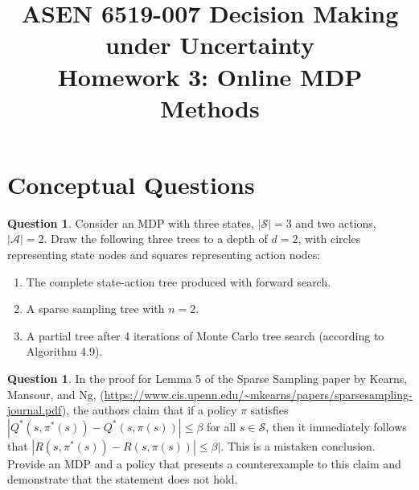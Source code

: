 \documentclass{article}
\title{ASEN 6519-007 Decision Making under Uncertainty\\
       Homework 3: Online MDP Methods}
\theoremstyle{definition}
\newtheorem{question}[thm]{Question}
\begin{document}
\maketitle

\section{Conceptual Questions}


\begin{question}
    Consider an MDP with three states, $|\mathcal{S}| = 3$ and two actions, $|\mathcal{A}| = 2$. Draw the following three trees to a depth of $d=2$, with circles representing state nodes and squares representing action nodes:
    \begin{enumerate}[label=(\alph*)]
        \item The complete state-action tree produced with forward search.
        \item A sparse sampling tree with $n=2$.
        \item A partial tree after 4 iterations of Monte Carlo tree search (according to Algorithm 4.9).
    \end{enumerate}

\end{question}

\begin{question}
    In the proof for Lemma 5 of the Sparse Sampling paper by Kearns, Mansour, and Ng, (\url{https://www.cis.upenn.edu/~mkearns/papers/sparsesampling-journal.pdf}), the authors claim that if a policy $\pi$ satisfies $|Q^*(s, \pi^*(s)) - Q^*(s, \pi(s))| \leq \beta$ for all $s \in \mathcal{S}$, then it immediately follows that $|R(s, \pi^*(s)) - R(s, \pi(s))| \leq \beta|$. This is a mistaken conclusion. Provide an MDP and a policy that presents a counterexample to this claim and demonstrate that the statement does not hold.
\end{question}
\end{document}
